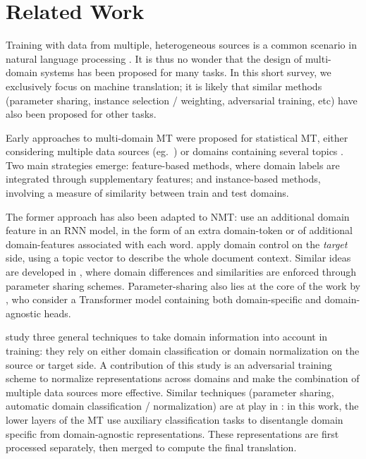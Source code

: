 \documentclass[11pt,a4paper]{article}
\newcommand{\mpDone}[1]{\done[MP]\Todo[MP:]{\textcolor{green}{#1}}}
\begin{document}
\section{Related Work \label{sec:related}}
\mpDone{related work}

Training with data from multiple, heterogeneous sources is a common scenario in natural language processing \cite{Dredze08online,Finkel09hierarchical}. It is thus no wonder that the design of multi-domain systems has been proposed for many tasks. In this short survey, we exclusively focus on machine translation; it is likely that similar methods (parameter sharing, instance selection / weighting, adversarial training, etc) have also been proposed for other tasks.

Early approaches to multi-domain MT were proposed for statistical MT, either considering multiple data sources (eg.\ \cite{Banerjee10combining,Clark12onesystem,Sennrich13multidomain,Huck15mixeddomain}) or domains containing several topics \cite{Eidelman12topic,Hasler14dynamic-topic}. Two main strategies emerge: feature-based methods, where domain labels are integrated through supplementary features; and instance-based methods, involving a measure of similarity between train and test domains. 

The former approach has also been adapted to NMT:  use an additional domain feature in an RNN model, in the form of an extra domain-token or of additional domain-features associated with each word. \citet{Chen16guided} apply domain control on the \emph{target} side, using a topic vector to describe the whole document context. Similar ideas are developed in \cite{Chu18multilingual,Pham19generic}, where domain differences and similarities are enforced through parameter sharing schemes. Parameter-sharing also lies at the core of the work by \citet{Jiang19multidomain}, who consider a Transformer model containing both domain-specific and domain-agnostic heads.

\citet{Britz17mixing} study three general techniques to take domain information into account in training: they rely on either domain classification or domain normalization on the source or target side. A contribution of this study is an adversarial training scheme to normalize representations across domains and make the combination of multiple data sources more effective. Similar techniques (parameter sharing, automatic domain classification / normalization) are at play in \cite{Zeng18multidomain}: in this work, the lower layers of the MT use auxiliary classification tasks to disentangle domain specific from domain-agnostic representations. These representations are first processed separately, then merged to compute the final translation.
\end{document}

